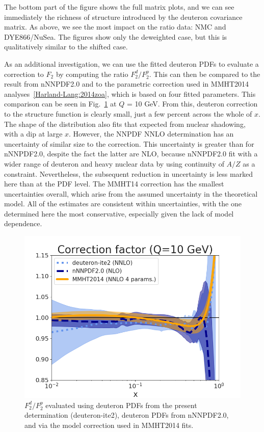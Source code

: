 The bottom part of the figure shows the full matrix plots, and we can see immediately the richness of structure introduced by the deuteron covariance matrix. As above, we see the most impact on the ratio data: NMC and DYE866/NuSea. The figures show only the deweighted case, but this is qualitatively similar to the shifted case. 

As an additional investigation, we can use the fitted deuteron PDFs to evaluate a correction to $F_2$ by computing the ratio $F_2^d/F_2^p$. This can then be compared to the result from nNNPDF2.0 and to the parametric correction used in MMHT2014 analyses~\ref{Harland-Lang:2014zoa}, which is based on four fitted parameters. This comparison can be seen in Fig.~\ref{fig:deutpdfcomp} at $Q$ = 10 GeV. From this, deuteron correction to the structure function is clearly small, just a few percent across the whole of $x$. The shape of the distribution also fits that expected from nuclear shadowing, with a dip at large $x$. However, the NNPDF NNLO determination has an uncertainty of similar size to the correction. This uncertainty is greater than for nNNPDF2.0, despite the fact the latter are NLO, because nNNPDF2.0 fit with a wider range of deuteron and heavy nuclear data by using continuity of $A/Z$ as a constraint. Nevertheless, the subsequent reduction in uncertainty is less marked here than at the PDF level. The MMHT14 correction has the smallest uncertainties overall, which arise from the assumed uncertainty in the theoretical model. All of the estimates are consistent within uncertainties, with the one determined here the most conservative, especially given the lack of model dependence. 

\begin{figure}[H]
  \begin{center}
      \includegraphics[width=0.8\linewidth]{nuclear/plots/deut_10.png}
    \caption{$F_2^d/F_2^p$ evaluated using deuteron PDFs from the present determination (deuteron-ite2), deuteron PDFs from nNNPDF2.0, and via the model correction used in MMHT2014 fits.
    \label{fig:deutpdfcomp} }
    \end{center}
\end{figure}   

